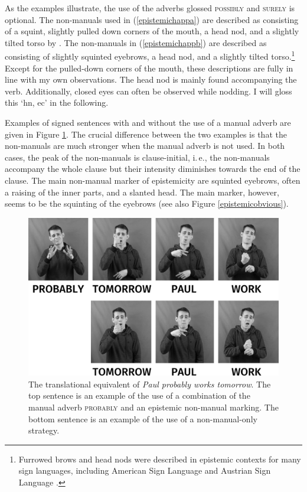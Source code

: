 \noindent As the examples illustrate, the use of the adverbs glossed \textsc{possibly} and \textsc{surely} is optional. The non-manuals used in (\ref{epistemichappa}) are described as consisting of a squint, slightly pulled down corners of the mouth, a head nod, and a slightly tilted torso by \citet[364]{happ2014vork}. The non-manuals in (\ref{epistemichappb}) are described as consisting of slightly squinted eyebrows, a head nod, and a slightly tilted torso.\footnote{ Furrowed brows and head nods were described in epistemic contexts for many sign languages, including American Sign Language \citep{wilcox2006modality} and Austrian Sign Language \citep{lackner2017functions}.} Except for the pulled-down corners of the mouth, these descriptions are fully in line with my own observations. The head nod is mainly found accompanying the verb. Additionally, closed eyes can often be observed while nodding. I will gloss this `hn, ec' in the following.

Examples of signed sentences with and without the use of a manual adverb are given in Figure \ref{probablynmmmanual}. The crucial difference between the two examples is that the non-manuals are much stronger when the manual adverb is not used. In both cases, the peak of the non-manuals is clause-initial, i.\,e., the non-manuals accompany the whole clause but their intensity diminishes towards the end of the clause. The main non-manual marker of epistemicity are squinted eyebrows, often a raising of the inner parts, and a slanted head. The main marker, however, seems to be the squinting of the eyebrows (see also Figure \ref{epistemicobvious}).


\begin{figure}[bt]
\centering
	\includegraphics[width=1.0\textwidth]{probablysw.jpg}
	\caption{The translational equivalent of \textit{Paul probably works tomorrow}. The top sentence is an example of the use of a combination of the manual adverb \textsc{probably} and an epistemic non-manual marking. The bottom sentence is an example of the use of a non-manual-only strategy.}
	\label{probablynmmmanual}
\end{figure}

